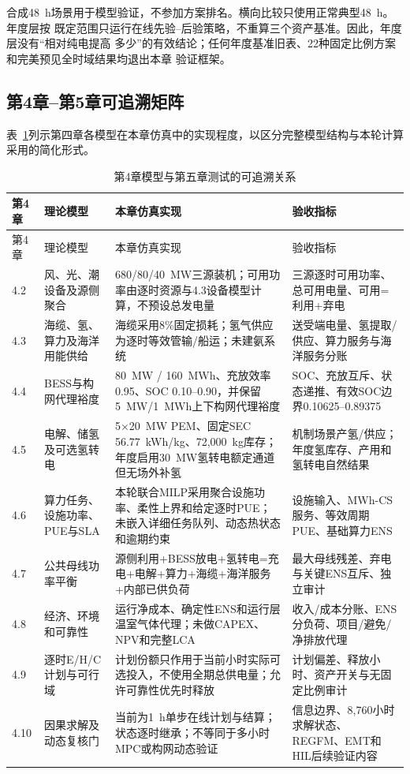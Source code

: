合成48~h场景用于模型验证，不参加方案排名。横向比较只使用正常典型48~h。年度层按
既定范围只运行在线先验--后验策略，不重算三个资产基准。因此，年度层没有“相对纯电提高
多少”的有效结论；任何年度基准旧表、22种固定比例方案和完美预见全时域结果均退出本章
验证框架。

\subsection{第4章--第5章可追溯矩阵}

表~\ref{tab:c4-c5-trace}列示第四章各模型在本章仿真中的实现程度，以区分完整模型结构与本轮计算采用的简化形式。

\begin{longtable}{p{1.4cm}p{3.0cm}p{5.6cm}p{4.0cm}}
\caption{第4章模型与第五章测试的可追溯关系}\label{tab:c4-c5-trace}\\
\toprule
第4章 & 理论模型 & 本章仿真实现 & 验收指标\\
\midrule
\endfirsthead
\toprule
第4章 & 理论模型 & 本章仿真实现 & 验收指标\\
\midrule
\endhead
4.2 & 风、光、潮设备及源侧聚合 & 680/80/40~MW三源装机；可用功率由逐时资源与4.3设备模型计算，不预设总发电量 & 三源逐时可用功率、总可用电量、可用=利用+弃电\\
4.3 & 海缆、氢、算力及海洋用能供给 & 海缆采用8\%固定损耗；氢气供应为逐时等效管输/船运；未建氨系统 & 送受端电量、氢提取/供应、算力服务与海洋服务分账\\
4.4 & BESS与构网代理裕度 & 80~MW / 160~MWh、充放效率0.95、SOC 0.10--0.90，并保留5~MW/1~MWh上下构网代理裕度 & SOC、充放互斥、状态递推、有效SOC边界0.10625--0.89375\\
4.5 & 电解、储氢及可选氢转电 & 5$\times$20~MW PEM、固定SEC 56.77~kWh/kg、72,000~kg库存；年度启用30~MW氢转电额定通道但无场外补氢 & 机制场景产氢/供应；年度氢库存、产用和氢转电自然结果\\
4.6 & 算力任务、设施功率、PUE与SLA & 本轮联合MILP采用聚合设施功率、柔性上界和给定逐时PUE；未嵌入详细任务队列、动态热状态和逾期约束 & 设施输入、MWh-CS服务、等效周期PUE、基础算力ENS\\
4.7 & 公共母线功率平衡 & 源侧利用+BESS放电+氢转电=充电+电解+算力+海缆+海洋服务+内部已供负荷 & 最大母线残差、弃电与关键ENS互斥、独立审计\\
4.8 & 经济、环境和可靠性 & 运行净成本、确定性ENS和运行层温室气体代理；未做CAPEX、NPV和完整LCA & 收入/成本分账、ENS分负荷、项目/避免/净排放代理\\
4.9 & 逐时E/H/C计划与可行域 & 计划份额只作用于当前小时实际可选投入，不使用全期总供电量；允许可靠性优先时释放 & 计划偏差、释放小时、资产开关与无固定比例审计\\
4.10 & 因果求解及动态复核门 & 当前为1~h单步在线计划与结算；状态逐时继承；不等同于多小时MPC或构网动态验证 & 信息边界、8,760小时求解状态、REGFM、EMT和HIL后续验证内容\\
\bottomrule
\end{longtable}

